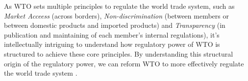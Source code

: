 As WTO sets multiple principles to regulate the world trade system, 
such as \textit{Market Acceess} (across borders), 
\textit{Non-discrimination} (between members 
or between domestic products and imported products) 
and \textit{Transparency} (in publication and maintaining 
of each member's internal regulations), 
it's intellectually intriguing 
to understand how regulatory power of WTO
is structured to achieve these core principles.
By understanding this structural origin of the regulatory power, 
we can reform WTO to more effectively regulate 
the world trade system 
\citep{FREDEBEULKREIN1999625, shaffer_2004, 10.1093/jiel/jgm028}.



